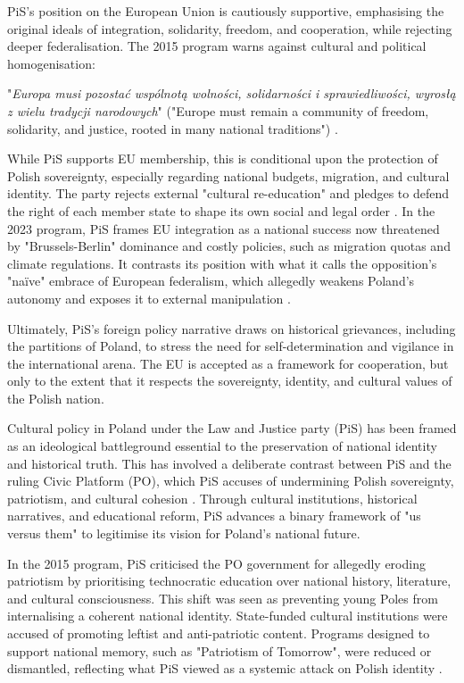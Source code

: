 PiS's position on the European Union is cautiously supportive, emphasising the original ideals of integration, solidarity, freedom, and cooperation, while rejecting deeper federalisation. The 2015 program warns against cultural and political homogenisation:

\begin{displayquote}
"\textit{Europa musi pozostać wspólnotą wolności, solidarności i sprawiedliwości, wyrosłą z wielu tradycji narodowych}" ("Europe must remain a community of freedom, solidarity, and justice, rooted in many national traditions") \citep{pis_program_2014}.
\end{displayquote}

While PiS supports EU membership, this is conditional upon the protection of Polish sovereignty, especially regarding national budgets, migration, and cultural identity. The party rejects external "cultural re-education" and pledges to defend the right of each member state to shape its own social and legal order \citep{pis_program_2014}. In the 2023 program, PiS frames EU integration as a national success now threatened by "Brussels-Berlin" dominance and costly policies, such as migration quotas and climate regulations. It contrasts its position with what it calls the opposition's "naïve" embrace of European federalism, which allegedly weakens Poland's autonomy and exposes it to external manipulation \citep{pis_program_2023}.

Ultimately, PiS's foreign policy narrative draws on historical grievances, including the partitions of Poland, to stress the need for self-determination and vigilance in the international arena. The EU is accepted as a framework for cooperation, but only to the extent that it respects the sovereignty, identity, and cultural values of the Polish nation.

Cultural policy in Poland under the Law and Justice party (PiS) has been framed as an ideological battleground essential to the preservation of national identity and historical truth. This has involved a deliberate contrast between PiS and the ruling Civic Platform (PO), which PiS accuses of undermining Polish sovereignty, patriotism, and cultural cohesion \citep{pis_program_2023}. Through cultural institutions, historical narratives, and educational reform, PiS advances a binary framework of "us versus them" to legitimise its vision for Poland's national future.

In the 2015 program, PiS criticised the PO government for allegedly eroding patriotism by prioritising technocratic education over national history, literature, and cultural consciousness. This shift was seen as preventing young Poles from internalising a coherent national identity. State-funded cultural institutions were accused of promoting leftist and anti-patriotic content. Programs designed to support national memory, such as "Patriotism of Tomorrow", were reduced or dismantled, reflecting what PiS viewed as a systemic attack on Polish identity \citep{pis_program_2014}.

